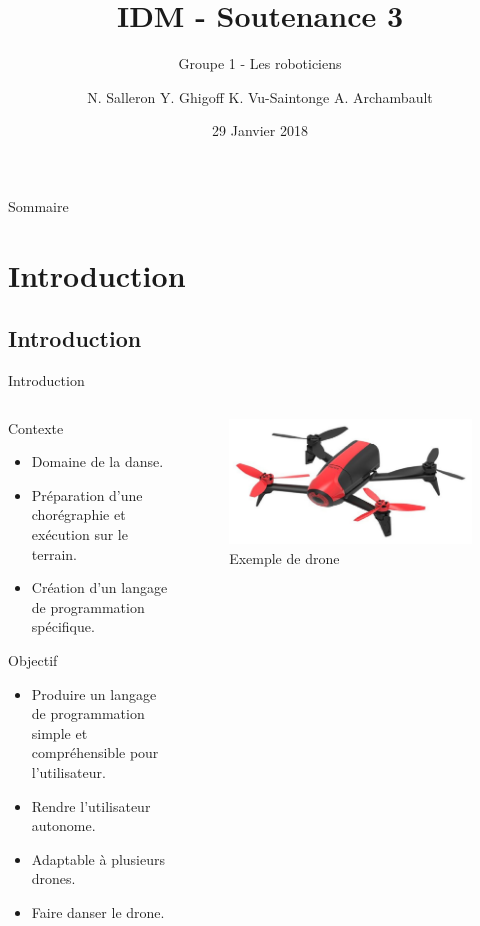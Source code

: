 \documentclass{bredelebeamer}
\title[Ingénierie dirigée par les Modèles]{IDM - Soutenance 3}
\subtitle{Groupe 1 - Les roboticiens}
\author{N. Salleron Y. Ghigoff K. Vu-Saintonge A. Archambault}
\date{29 Janvier 2018}
\begin{document}
\begin{frame}
  \titlepage
\end{frame}

\begin{frame}{Sommaire}
  \tableofcontents
\end{frame}

\section{Introduction}
\subsection{Introduction}


\begin{frame}{Introduction}
\begin{columns}
\begin{column}{0.5\textwidth}
\begin{alertblock}{Contexte}
\begin{itemize}
\item Domaine de la danse.
\item Préparation d'une chorégraphie et exécution sur le terrain.
\item Création d'un langage de programmation spécifique.
\end{itemize}
\end{alertblock}
\begin{block}{Objectif}
\begin{itemize}
\item Produire un langage de programmation \alert{simple} et \alert{compréhensible} pour l'utilisateur.
\item Rendre l'utilisateur autonome.
\item Adaptable à  plusieurs drones.
\item Faire danser le drone.
\end{itemize}
\end{block}
\end{column}
\begin{column}{0.5\textwidth}
\begin{figure}
\centering
\includegraphics[scale=0.15]{images/img1.jpg}
\caption{Exemple de drone}
\end{figure}
\end{column}
\end{columns}
\end{frame}
\end{document}
